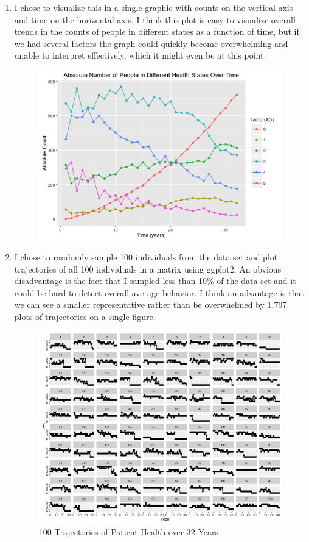 \documentclass[11pt]{article}
\begin{document}
\begin{enumerate}
\begin{enumerate}
\begin{figure}[H]
			\end{figure}
			\item I chose to visualize this in a single graphic with counts on the vertical axis and time on the horizontal axis. I think  this plot is easy to visualize overall trends in the counts of people in different states as a function of time, but if we had several factors the graph could quickly become overwhelming and unable to interpret effectively, which it might even be at this point.
			\begin{figure}[H]
				\centering
				\includegraphics[scale=0.75]{Rplotp4p2}
			\end{figure}
			\item I chose to randomly sample 100 individuals from the data set and plot trajectories of all 100 individuals in a matrix using ggplot2. An obvious disadvantage is the fact that I sampled less than 10\% of the data set and it could be hard to detect overall average behavior. I think an advantage is that we can see a smaller representative rather than be overwhelmed by 1,797 plots of trajectories on a single figure.
			\begin{figure}[H]
			\caption{100 Trajectories of Patient Health over 32 Years}
				\centering
				\includegraphics[scale=0.5]{Rplotp4p3}
			\end{figure}
		\end{enumerate}
\end{enumerate}
\end{document}
